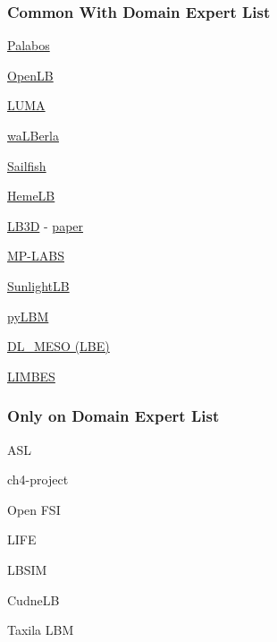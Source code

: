 \documentclass[t,12pt,numbers,fleqn]{beamer}
\begin{document}

\begin{frame}
\frametitle{Common With Domain Expert List}

\begin{multicols}{2}	
  \bi
\item \href{https://palabos.unige.ch/}{Palabos}
\item \href{https://www.openlb.net/}{OpenLB}
\item \href{https://github.com/aharwood2/LUMA/}{LUMA}
\item \href{https://www.walberla.net}{waLBerla}
\item \href{http://sailfish.us.edu.pl/}{Sailfish}
\item \href{https://github.com/UCL/hemelb}{HemeLB}
\item \href{http://ccs.chem.ucl.ac.uk/lb3d}{LB3D} - \href{https://www.sciencedirect.com/science/article/pii/S0010465517301017}{paper}
\item \href{https://github.com/carlosrosales/mplabs}{MP-LABS}
\item \href{http://sunlightlb.sourceforge.net/}{SunlightLB}
\item \href{https://pypi.org/project/pylbm/}{pyLBM}
\item  \href{https://www.scd.stfc.ac.uk/Pages/DL_MESO.aspx}{DL\_MESO (LBE)}
\item \href{https://code.google.com/archive/p/limbes/}{LIMBES}
                          
	\ei
\end{multicols}

\end{frame}


\begin{frame}
\frametitle{Only on Domain Expert List}

\begin{multicols}{2}	
  \bi
                        \item ASL
                        \item ch4-project
                        \item Open FSI
                        \item LIFE
                        \item LBSIM
                        \item CudneLB
                        \item Taxila LBM
                    
	\ei
\end{multicols}

\end{frame}
\end{document}

